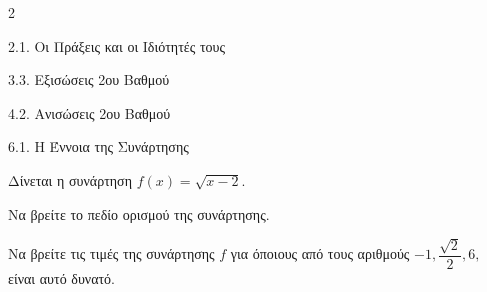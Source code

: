 \begin{ylh}{2}
    \item 2.1. Οι Πράξεις και οι Ιδιότητές τους
    \item 3.3. Εξισώσεις 2ου Βαθμού
    \item 4.2. Ανισώσεις 2ου Βαθμού
    \item 6.1. Η Έννοια της Συνάρτησης
\end{ylh}
Δίνεται η συνάρτηση $f(x) = \sqrt{x - 2}.$
\begin{alist}
\item Να βρείτε το πεδίο ορισμού της συνάρτησης.
\item Να βρείτε τις τιμές της συνάρτησης $f$ για όποιους από τους αριθμούς $- 1,\dfrac{\sqrt{2}}{2},6,$ είναι αυτό δυνατό.
\end{alist}


